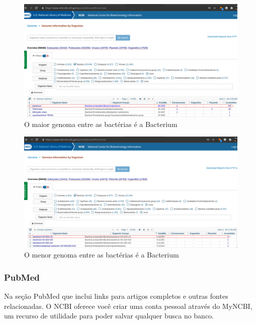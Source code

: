 \begin{figure}[!htp]
    \centering
    \includegraphics[scale=.33]{img/big_bacterium.png}
    \caption{
        O maior genoma entre as bactérias é a Bacterium
    } 
    \label{img:genomas_bacterium_big}
\end{figure}


\begin{figure}[!htp]
    \centering
    \includegraphics[scale=.33]{img/small_bacterium.png}
    \caption{
        O menor genoma entre as bactérias é a Bacterium
    } 
    \label{img:genomas_bacterium_small}
\end{figure}




\newpage
\subsubsection{PubMed}

Na seção PubMed que inclui links para artigos completos e outras fontes relacionadas. 
O NCBI oferece você criar uma conta pessoal através do MyNCBI, um recurso de utilidade para poder salvar qualquer busca no banco. 

